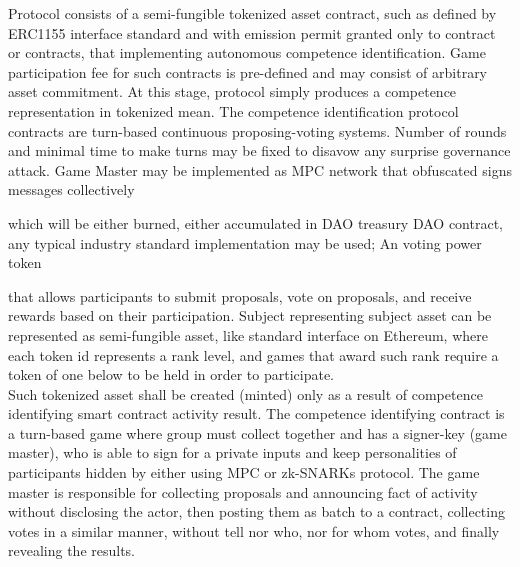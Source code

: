 \documentclass{article}
\begin{document}
\begin{CJK}{UTF8}{gbsn}
\begin{multicols}{2}
    \end{multicols}
    
    \begin{multicols}{2}



        Protocol consists of a semi-fungible tokenized asset contract, such as defined by ERC1155\cite{EIP1155} interface standard and with emission permit granted only to contract or contracts, that implementing autonomous competence identification. Game participation fee for such contracts is pre-defined and may consist of arbitrary asset commitment.
        At this stage, protocol simply produces a competence representation in tokenized mean. The competence identification protocol contracts are turn-based continuous proposing-voting systems. Number of rounds and minimal time to make turns may be fixed to disavow any surprise governance attack. Game Master may be implemented as MPC network that obfuscated signs messages collectively

        which will be either burned, either accumulated in DAO treasury      DAO contract, any typical industry standard implementation may be used; An voting power token


        that allows participants to submit proposals, vote on proposals, and receive rewards based on their participation. Subject representing subject asset can be represented as semi-fungible asset, like standard interface on Ethereum, where each token id represents a rank level, and games that award such rank require a token of one below to be held in order to participate. \\ Such tokenized asset shall be created (minted) only as a result of competence identifying smart contract activity result. The competence identifying contract is a turn-based game where group must collect together and has a signer-key (game master), who is able to sign for a private inputs and keep personalities of participants hidden by either using MPC or zk-SNARKs protocol.
        The game master is responsible for collecting proposals and announcing fact of activity without disclosing the actor, then posting them as batch to a contract, collecting votes in a similar manner, without tell nor who, nor for whom votes, and finally revealing the results.\\




\end{multicols}
\end{CJK}
\end{document}
